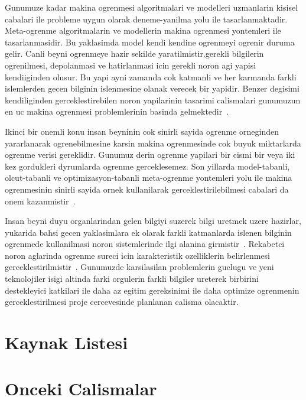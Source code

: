 Gunumuze kadar makina ogrenmesi algoritmalari ve modelleri uzmanlarin
kisisel cabalari ile probleme uygun olarak deneme-yanilma yolu ile
tasarlanmaktadir.  Meta-ogrenme algoritmalarin ve modellerin makina
ogrenmesi yontemleri ile tasarlanmasidir. Bu yaklasimda model kendi
kendine ogrenmeyi ogrenir duruma gelir.  Canli beyni ogrenmeye hazir
sekilde yaratilmistir.gerekli bilgilerin ogrenilmesi, depolanmasi ve
hatirlanmasi icin gerekli noron agi yapisi kendiiginden olusur. Bu
yapi ayni zamanda cok katmanli ve her karmanda farkli islemlerden
gecen bilginin islenmesine olanak verecek bir yapidir. Benzer degisimi
kendiliginden gerceklestirebilen noron yapilarinin tasarimi
calismalari gunumuzun en uc makina ogrenmesi problemlerinin basinda
gelmektedir~\cite{Hanxio:2018}.

Ikinci bir onemli konu insan beyninin cok sinirli sayida ogrenme
orneginden yararlanarak ogrenebilmesine karsin makina ogrenmesinde cok
buyuk miktarlarda ogrenme verisi gereklidir. Gunumuz derin ogrenme
yapilari bir cismi bir veya iki kez gordukleri dyrumlarda ogrenme
gerceklesemez. Son yillarda model-tabanli, olcut-tabanli ve
optimizasyon-tabanli meta-ogrenme yontemleri yolu ile makina
ogrenmesinin sinirli sayida ornek kullanilarak gerceklestirilebilmesi
cabalari da onem kazanmistir~\cite{Vinyals:2016}.


Insan beyni duyu organlarindan gelen bilgiyi suzerek bilgi uretmek
uzere hazirlar, yukarida bahsi gecen yaklasimlara ek olarak farkli
katmanlarda islenen bilginin ogrenmede kullanilmasi noron
sistemlerinde ilgi alanina
girmistir~\cite{Rumelhart:1985,DeSieno:1988}.  Rekabetci noron
aglarinda ogrenme sureci icin karakteristik ozelliklerin belirlenmesi
gerceklestirilmistir~\cite{Rumelhart:1985}.  Gunumuzde karsilasilan
problemlerin guclugu ve yeni teknolojiler isigi altinda farki
orgulerin farkli bilgiler ureterek birbirini destekleyici katkilari
ile daha az egitim gereksinimi ile daha optimize ogrenmenin
gerceklestirilmesi proje cercevesinde planlanan calisma olacaktir.


\section{Kaynak Listesi}




\section{Onceki Calismalar}





